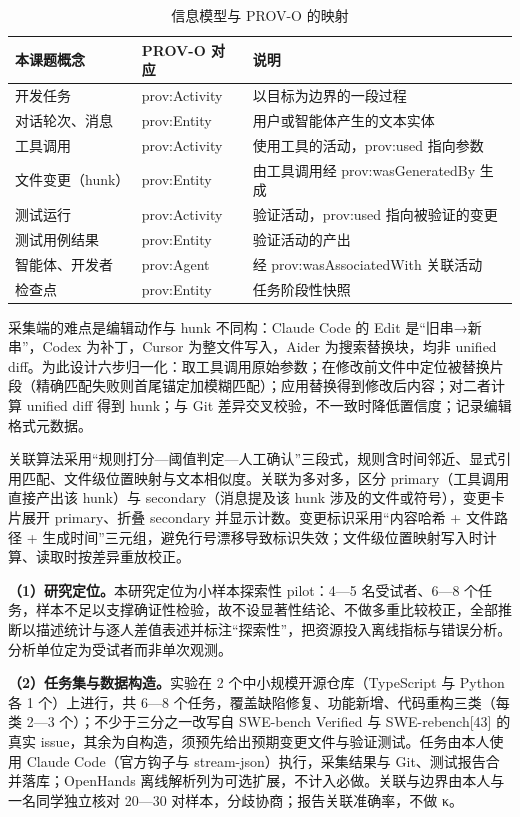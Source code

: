 \begin{table}[H]
  \centering
  \caption{信息模型与 PROV-O 的映射}
  \label{tab:prov}
  \begin{tabularx}{\linewidth}{@{}ll>{\raggedright\arraybackslash}X@{}}
    \toprule
    本课题概念 & PROV-O 对应 & 说明 \\
    \midrule
    开发任务 & prov:Activity & 以目标为边界的一段过程 \\
    对话轮次、消息 & prov:Entity & 用户或智能体产生的文本实体 \\
    工具调用 & prov:Activity & 使用工具的活动，prov:used 指向参数 \\
    文件变更（hunk） & prov:Entity & 由工具调用经 prov:wasGeneratedBy 生成 \\
    测试运行 & prov:Activity & 验证活动，prov:used 指向被验证的变更 \\
    测试用例结果 & prov:Entity & 验证活动的产出 \\
    智能体、开发者 & prov:Agent & 经 prov:wasAssociatedWith 关联活动 \\
    检查点 & prov:Entity & 任务阶段性快照 \\
    \bottomrule
  \end{tabularx}
\end{table}

采集端的难点是编辑动作与 hunk 不同构：Claude Code 的 Edit 是“旧串→新串”，Codex 为补丁，Cursor 为整文件写入，Aider 为搜索替换块，均非 unified diff。为此设计六步归一化：取工具调用原始参数；在修改前文件中定位被替换片段（精确匹配失败则首尾锚定加模糊匹配）；应用替换得到修改后内容；对二者计算 unified diff 得到 hunk；与 Git 差异交叉校验，不一致时降低置信度；记录编辑格式元数据。

关联算法采用“规则打分—阈值判定—人工确认”三段式，规则含时间邻近、显式引用匹配、文件级位置映射与文本相似度。关联为多对多，区分 primary（工具调用直接产出该 hunk）与 secondary（消息提及该 hunk 涉及的文件或符号），变更卡片展开 primary、折叠 secondary 并显示计数。变更标识采用“内容哈希 + 文件路径 + 生成时间”三元组，避免行号漂移导致标识失效；文件级位置映射写入时计算、读取时按差异重放校正。


\textbf{（1）研究定位。}本研究定位为小样本探索性 pilot：4—5 名受试者、6—8 个任务，样本不足以支撑确证性检验，故不设显著性结论、不做多重比较校正，全部推断以描述统计与逐人差值表述并标注“探索性”，把资源投入离线指标与错误分析。分析单位定为受试者而非单次观测。

\textbf{（2）任务集与数据构造。}实验在 2 个中小规模开源仓库（TypeScript 与 Python 各 1 个）上进行，共 6—8 个任务，覆盖缺陷修复、功能新增、代码重构三类（每类 2—3 个）；不少于三分之一改写自 SWE-bench Verified 与 SWE-rebench[43] 的真实 issue，其余为自构造，须预先给出预期变更文件与验证测试。任务由本人使用 Claude Code（官方钩子与 stream-json）执行，采集结果与 Git、测试报告合并落库；OpenHands 离线解析列为可选扩展，不计入必做。关联与边界由本人与一名同学独立核对 20—30 对样本，分歧协商；报告关联准确率，不做 κ。

